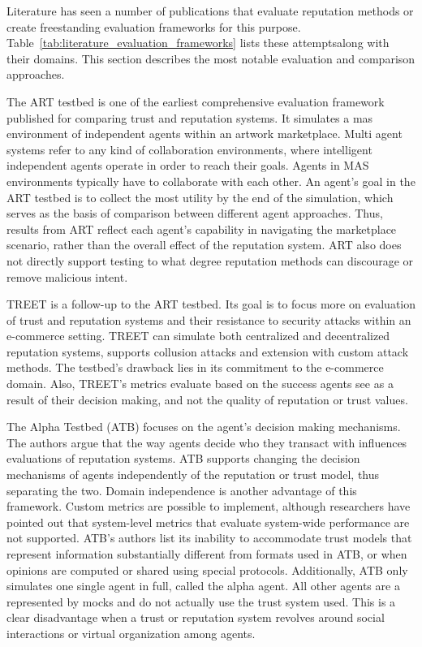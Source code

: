 \documentclass[%
    ]{\PathToTumTemplate/thesis/tum_thesis}
\begin{document}
Literature has seen a number of publications that evaluate reputation methods or create freestanding evaluation frameworks for this purpose.
Table~\ref{tab:literature_evaluation_frameworks} lists these attemptsalong with their domains.
This section describes the most notable evaluation and comparison approaches.

The ART testbed is one of the earliest comprehensive evaluation framework published for comparing trust and reputation systems\cite{fullam_specication_2005}.
It simulates a \acrfull{mas} environment of independent agents within an artwork marketplace.
Multi agent systems refer to any kind of collaboration environments, where intelligent independent agents operate in order to reach their goals.
Agents in MAS environments typically have to collaborate with each other.
An agent's goal in the ART testbed is to collect the most utility by the end of the simulation, which serves as the basis of comparison between different agent approaches.
Thus, results from ART reflect each agent's capability in navigating the marketplace scenario, rather than the overall effect of the reputation system.
ART also does not directly support testing to what degree reputation methods can discourage or remove malicious intent.

TREET is a follow-up to the ART testbed\cite{kerr_treet_2010}.
Its goal is to focus more on evaluation of trust and reputation systems and their resistance to security attacks within an e-commerce setting.
TREET can simulate both centralized and decentralized reputation systems, supports collusion attacks and extension with custom attack methods.
The testbed's drawback lies in its commitment to the e-commerce domain.
Also, TREET's metrics evaluate based on the success agents see as a result of their decision making, and not the quality of reputation or trust values.

The Alpha Testbed (ATB) focuses on the agent's decision making mechanisms\cite{jelenc_decision_2013}.
The authors argue that the way agents decide who they transact with influences evaluations of reputation systems.
ATB supports changing the decision mechanisms of agents independently of the reputation or trust model, thus separating the two.
Domain independence is another advantage of this framework.
Custom metrics are possible to implement, although researchers have pointed out that system-level metrics that evaluate system-wide performance are not supported\cite{adamopoulou_simulation_2014}.
ATB's authors list its inability to accommodate trust models that represent information substantially different from formats used in ATB, or when opinions are computed or shared using special protocols.
Additionally, ATB only simulates one single agent in full, called the alpha agent.
All other agents are a represented by mocks and do not actually use the trust system used.
This is a clear disadvantage when a trust or reputation system revolves around social interactions or virtual organization among agents.
\end{document}
